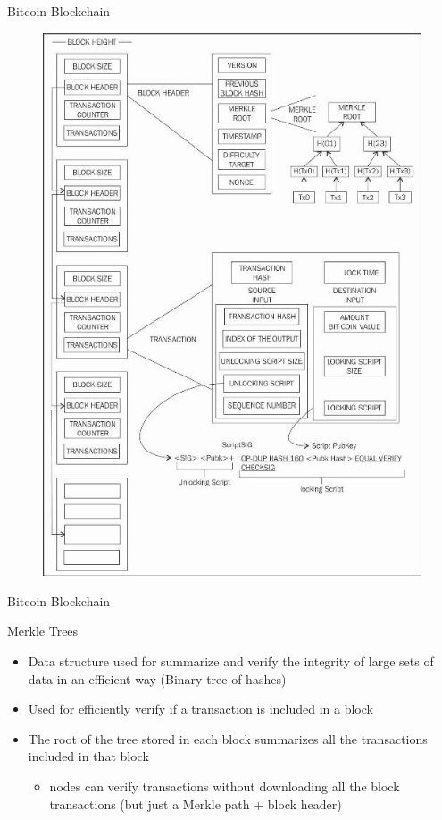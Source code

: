 \documentclass{beamer}
\begin{document}
  
  
  \begin{frame}{Bitcoin Blockchain}
    \begin{figure}[!htb]
    \centering
    \includegraphics[width=0.45\linewidth]{../img/bitcoin-blockchain-scheme.png}
    \end{figure}
  \end{frame}
  
  
  
  \begin{frame}{Bitcoin Blockchain}
      \begin{block}{Merkle Trees}
          \begin{itemize}
              \item Data structure used for summarize and verify the integrity of large sets of data in an efficient way (Binary tree of hashes)
              \item Used for efficiently verify if a transaction is included in a block
              \item The root of the tree stored in each block summarizes all the transactions included in that block
              \begin{itemize}
                  \item [\MVRightarrow] nodes can verify transactions without downloading all the block transactions (but just a Merkle path + block header)
              \end{itemize} 
          \end{itemize}
      \end{block}
  \end{frame}
  
  
  
\end{document}
